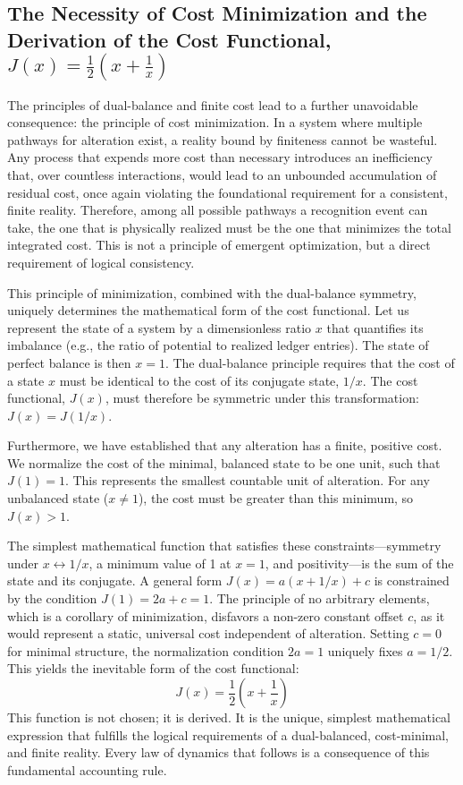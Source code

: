 \documentclass[11pt,a4paper]{article}
\begin{document}
\subsection{The Necessity of Cost Minimization and the Derivation of the Cost Functional, \texorpdfstring{$J(x) = \frac{1}{2}(x + \frac{1}{x})$}{J(x) = 1/2(x + 1/x)}}
The principles of dual-balance and finite cost lead to a further unavoidable consequence: the principle of cost minimization. In a system where multiple pathways for alteration exist, a reality bound by finiteness cannot be wasteful. Any process that expends more cost than necessary introduces an inefficiency that, over countless interactions, would lead to an unbounded accumulation of residual cost, once again violating the foundational requirement for a consistent, finite reality. Therefore, among all possible pathways a recognition event can take, the one that is physically realized must be the one that minimizes the total integrated cost. This is not a principle of emergent optimization, but a direct requirement of logical consistency.

This principle of minimization, combined with the dual-balance symmetry, uniquely determines the mathematical form of the cost functional. Let us represent the state of a system by a dimensionless ratio \(x\) that quantifies its imbalance (e.g., the ratio of potential to realized ledger entries). The state of perfect balance is then \(x=1\). The dual-balance principle requires that the cost of a state \(x\) must be identical to the cost of its conjugate state, \(1/x\). The cost functional, \(J(x)\), must therefore be symmetric under this transformation: \(J(x) = J(1/x)\).

Furthermore, we have established that any alteration has a finite, positive cost. We normalize the cost of the minimal, balanced state to be one unit, such that \(J(1) = 1\). This represents the smallest countable unit of alteration. For any unbalanced state (\(x \neq 1\)), the cost must be greater than this minimum, so \(J(x) > 1\).

The simplest mathematical function that satisfies these constraints—symmetry under \(x \leftrightarrow 1/x\), a minimum value of 1 at \(x=1\), and positivity—is the sum of the state and its conjugate. A general form \(J(x) = a(x + 1/x) + c\) is constrained by the condition \(J(1) = 2a + c = 1\). The principle of no arbitrary elements, which is a corollary of minimization, disfavors a non-zero constant offset \(c\), as it would represent a static, universal cost independent of alteration. Setting \(c=0\) for minimal structure, the normalization condition \(2a=1\) uniquely fixes \(a=1/2\). This yields the inevitable form of the cost functional:
\begin{equation}
J(x) = \frac{1}{2}\left(x + \frac{1}{x}\right)
\end{equation}
This function is not chosen; it is derived. It is the unique, simplest mathematical expression that fulfills the logical requirements of a dual-balanced, cost-minimal, and finite reality. Every law of dynamics that follows is a consequence of this fundamental accounting rule.
\end{document}
